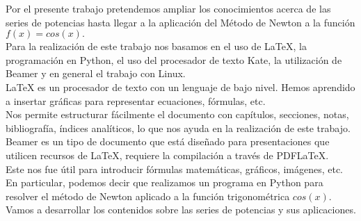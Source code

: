 
Por el presente trabajo pretendemos ampliar los conocimientos acerca de las series de potencias hasta llegar a la aplicación del Método de Newton a la función $f(x)=cos(x).$ \\
Para la realización de este trabajo nos basamos en el uso de \LaTeX{}, la programación en Python, el uso del procesador de texto Kate, la utilización de Beamer y en general el trabajo con Linux.\\
\LaTeX{} es un procesador de texto con un lenguaje de bajo nivel. Hemos aprendido a insertar gráficas para representar ecuaciones, fórmulas, etc.\\
Nos permite estructurar fácilmente el documento con capítulos, secciones, notas, bibliografía, índices analíticos, lo que nos ayuda en la realización de este trabajo.\\
Beamer es un tipo de documento que está diseñado para presentaciones que utilicen recursos de \LaTeX{}, requiere la compilación a través de PDF\LaTeX{}. \\
Este nos fue útil para introducir fórmulas matemáticas, gráficos, imágenes, etc. \\
En particular, podemos decir que realizamos un programa en Python para resolver el método de Newton aplicado a la función trigonométrica $cos(x)$.\\
Vamos a desarrollar los contenidos sobre las series de potencias y sus aplicaciones.

